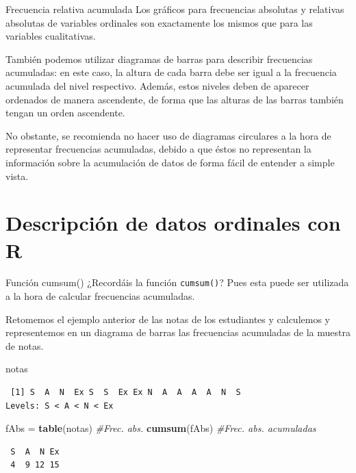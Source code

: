 \documentclass[
  ignorenonframetext,
]{beamer}
\newenvironment{Shaded}{\begin{snugshade}}{\end{snugshade}}
\newcommand{\CommentTok}[1]{\textcolor[rgb]{0.56,0.35,0.01}{\textit{#1}}}
\newcommand{\FunctionTok}[1]{\textcolor[rgb]{0.13,0.29,0.53}{\textbf{#1}}}
\newcommand{\NormalTok}[1]{#1}
\newcommand{\OtherTok}[1]{\textcolor[rgb]{0.56,0.35,0.01}{#1}}
\begin{document}
\begin{frame}{Frecuencia relativa acumulada}
\label{frecuencia-relativa-acumulada-3}
Los gráficos para frecuencias absolutas y relativas absolutas de
variables ordinales son exactamente los mismos que para las variables
cualitativas.

También podemos utilizar diagramas de barras para describir frecuencias
acumuladas: en este caso, la altura de cada barra debe ser igual a la
frecuencia acumulada del nivel respectivo. Además, estos niveles deben
de aparecer ordenados de manera ascendente, de forma que las alturas de
las barras también tengan un orden ascendente.

No obstante, se recomienda no hacer uso de diagramas circulares a la
hora de representar frecuencias acumuladas, debido a que éstos no
representan la información sobre la acumulación de datos de forma fácil
de entender a simple vista.
\end{frame}

\section{Descripción de datos ordinales con
R}\label{descripciuxf3n-de-datos-ordinales-con-r}

\begin{frame}[fragile]{Función cumsum()}
\label{funciuxf3n-cumsum}
¿Recordáis la función \texttt{cumsum()}? Pues esta puede ser utilizada a
la hora de calcular frecuencias acumuladas.

Retomemos el ejemplo anterior de las notas de los estudiantes y
calculemos y representemos en un diagrama de barras las frecuencias
acumuladas de la muestra de notas.

\begin{Shaded}
\begin{Highlighting}[]
\NormalTok{notas}
\end{Highlighting}
\end{Shaded}

\begin{verbatim}
 [1] S  A  N  Ex S  S  Ex Ex N  A  A  A  A  N  S 
Levels: S < A < N < Ex
\end{verbatim}

\begin{Shaded}
\begin{Highlighting}[]
\NormalTok{fAbs }\OtherTok{=} \FunctionTok{table}\NormalTok{(notas) }\CommentTok{\#Frec. abs.}
\FunctionTok{cumsum}\NormalTok{(fAbs) }\CommentTok{\#Frec. abs. acumuladas}
\end{Highlighting}
\end{Shaded}

\begin{verbatim}
 S  A  N Ex 
 4  9 12 15 
\end{verbatim}
\end{frame}
\end{document}
